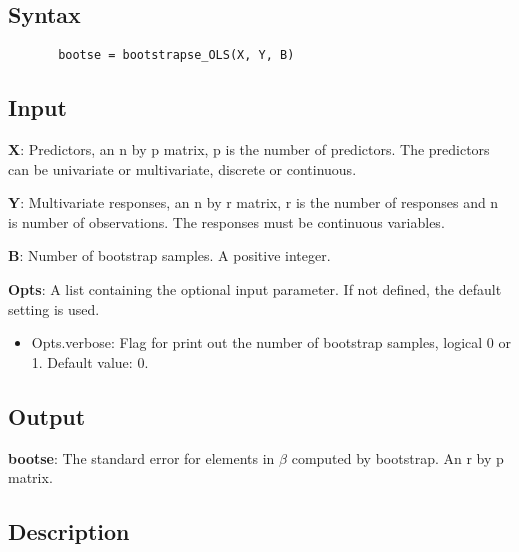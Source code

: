 \documentclass[a4paper,11pt,openany]{memoir}
\begin{document}
\subsection*{Syntax}


\begin{verbatim}       bootse = bootstrapse_OLS(X, Y, B)\end{verbatim}
    

\subsection*{Input}

\begin{par}
\textbf{X}: Predictors, an n by p matrix, p is the number of predictors.  The predictors can be univariate or multivariate, discrete or continuous.
\end{par} \vspace{1em}
\begin{par}
\textbf{Y}: Multivariate responses, an n by r matrix, r is the number of responses and n is number of observations.  The responses must be continuous variables.
\end{par} \vspace{1em}
\begin{par}
\textbf{B}: Number of bootstrap samples.  A positive integer.
\end{par} \vspace{1em}
\begin{par}
\textbf{Opts}: A list containing the optional input parameter. If not defined, the default setting is used.
\end{par} \vspace{1em}
\begin{itemize}
\setlength{\itemsep}{-1ex}
   \item Opts.verbose: Flag for print out the number of bootstrap samples, logical 0 or 1. Default value: 0.
\end{itemize}


\subsection*{Output}

\begin{par}
\textbf{bootse}: The standard error for elements in $\beta$ computed by bootstrap.  An r by p matrix.
\end{par} \vspace{1em}


\subsection*{Description}
\end{document}
